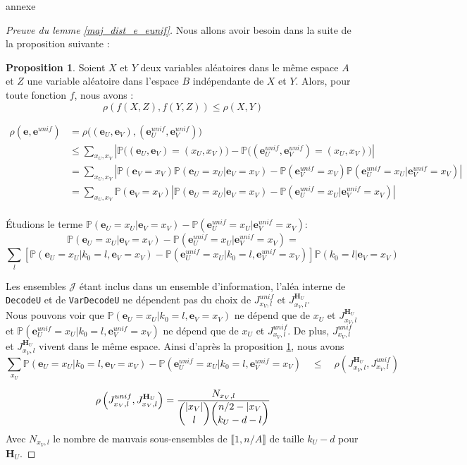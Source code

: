 \documentclass[12pt]{article}
\theoremstyle{definition}
\newtheorem{propo}[thm]{Proposition}
\newcommand{\e}{\mathbf{e}}
\newcommand{\J}{\mathcal{J}}
\begin{document}
annexe
\begin{proof}[Preuve du lemme \ref{maj_dist_e_eunif}]
Nous allons avoir besoin dans la suite de la proposition suivante :
\begin{propo}\label{rho_f}
Soient $X$ et $Y$ deux variables aléatoires dans le même espace $A$ et $Z$ une variable aléatoire dans l'espace $B$ indépendante de $X$ et $Y$. Alors, pour toute fonction $f$, nous avons : $$ \rho(f(X,Z),f(Y,Z)) \leq \rho(X,Y)$$
\end{propo}

{\scriptsize
\begin{equation*}
\begin{split}
\rho(\e,\e^{unif}) &= \rho\Big((\e_U,\e_V),(\e_U^{unif},\e_V^{unif})\Big)\\
&\leq \sum\limits_{x_U,x_V} \left|\mathbb{P}\Big((\e_U,\e_V)=(x_U,x_V)\Big) - \mathbb{P}\Big((\e_U^{unif},\e_V^{unif})=(x_U,x_V)\Big)\right|\\
&= \sum\limits_{x_U,x_V} \left|\mathbb{P}(\e_V = x_V)\mathbb{P}(\e_U=x_U|\e_V=x_V) - \mathbb{P}(\e_V^{unif} = x_V)\mathbb{P}(\e_U^{unif}=x_U | \e_V^{unif}=x_V)\right|\\
&= \sum\limits_{x_U,x_V} \mathbb{P}(\e_V = x_V)\left|\mathbb{P}(\e_U=x_U|\e_V=x_V) - \mathbb{P}(\e_U^{unif}=x_U | \e_V^{unif}=x_V)\right|\\
\end{split}
\end{equation*}}

Étudions le terme  $\mathbb{P}(\e_U=x_U|\e_V=x_V) - \mathbb{P}(\e_U^{unif}=x_U | \e_V^{unif}=x_V)$:
{\scriptsize
$$ \mathbb{P}(\e_U=x_U|\e_V=x_V) - \mathbb{P}(\e_U^{unif}=x_U | \e_V^{unif}=x_V) =  $$
$$ \sum\limits_l \left[ \mathbb{P}(\e_U=x_U|k_0 = l,\e_V=x_V) - \mathbb{P}(\e_U^{unif}=x_U |k_0 = l, \e_V^{unif}=x_V) \right] \mathbb{P}\left(k_0 = l | \e_V =x_V\right)$$
}

Les ensembles $\J$ étant inclus dans un ensemble d'information, l'aléa interne de \verb|DecodeU| et de \verb|VarDecodeU| ne dépendent pas du choix de $J_{x_V,l}^{unif}$ et $J_{x_V, l}^{\mathbf{H}_U}$. \\
Nous pouvons voir que $\mathbb{P}(\e_U=x_U|k_0 = l,\e_V=x_V)$ ne dépend que de $x_U$ et $J_{x_V, l}^{\mathbf{H}_U}$ et   $\mathbb{P}(\e_U^{unif}=x_U |k_0 = l, \e_V^{unif}=x_V)$ ne dépend que de $x_U$ et $J_{x_V, l}^{unif}$. 
De plus, $J_{x_V,l}^{unif}$ et $J_{x_V, l}^{\mathbf{H}_U}$ vivent dans le même espace.
Ainsi d'après la proposition \ref{rho_f}, nous avons 
{\scriptsize
$$ \sum\limits_{x_U}\mathbb{P}(\e_U=x_U|k_0 = l,\e_V=x_V) - \mathbb{P}(\e_U^{unif}=x_U |k_0 = l, \e_V^{unif}=x_V)\quad \leq\quad \rho(J_{x_V, l}^{\mathbf{H}_U},J_{x_V, l}^{unif})$$
}


\begin{equation}
\rho\left(J_{x_V,l}^{unif},J_{x_V, l}^{\mathbf{H}_U}\right) = \frac{N_{x_V,l}}{\dbinom{|x_V|}{l}\dbinom{n/2-|x_V}{k_U-d-l}}
\end{equation}
Avec $N_{x_V,l}$ le nombre de mauvais sous-ensembles de $\llbracket1,n/A\rrbracket$ de taille $k_U-d$ pour $\mathbf{H}_U$.
\end{proof}
\end{document}
